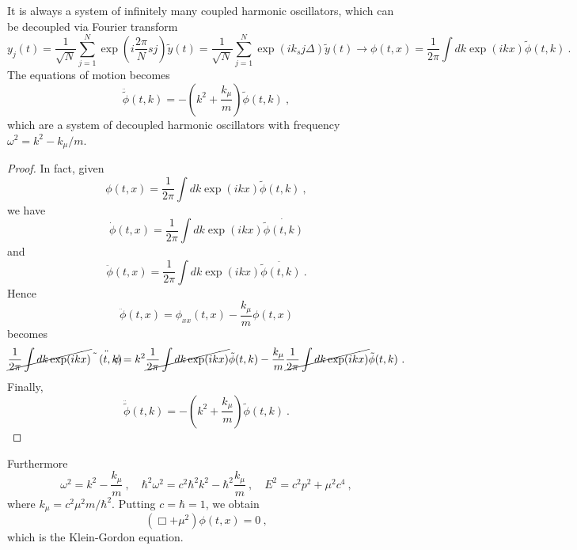     It is always a system of infinitely many coupled harmonic oscillators, which can be decoupled via Fourier transform 
    \begin{equation*}
        y_j(t) = \frac{1}{\sqrt{N}} \sum_{j=1}^N \exp(i \frac{2 \pi}{N} s j) \tilde y(t) = \frac{1}{\sqrt{N}} \sum_{j=1}^N \exp(i k_s j \Delta) \tilde y(t) \rightarrow \phi(t, x) = \frac{1}{2\pi} \int dk \exp(i k x) \tilde \phi(t, k) ~.
    \end{equation*}
    The equations of motion becomes 
    \begin{equation*}
        \ddot{\tilde \phi} (t, k) = - (k^2 + \frac{k_\mu}{m}) \tilde \phi(t, k) ~,
    \end{equation*}
    which are a system of decoupled harmonic oscillators with frequency $\omega^2 = k^2 - k_\mu / m$. 
    \begin{proof}
        In fact, given 
        \begin{equation*}
            \phi(t, x) = \frac{1}{2\pi} \int dk \exp(i k x) \tilde \phi(t, k)  ~,
        \end{equation*}
        we have 
        \begin{equation*}
            \dot \phi(t, x) = \frac{1}{2\pi} \int dk \exp(i k x) \dot{\tilde \phi(t, k)} 
        \end{equation*}
        and 
        \begin{equation*}
            \ddot \phi(t, x) = \frac{1}{2\pi} \int dk \exp(i k x) \ddot{\tilde \phi(t, k)} ~. 
        \end{equation*}
        Hence 
        \begin{equation*}
            \ddot \phi(t, x) = \phi_{xx} (t, x) - \frac{k_\mu}{m} \phi(t, x) 
        \end{equation*}
        becomes 
        \begin{equation*}
            \cancel{\frac{1}{2\pi} \int dk \exp(i k x)} \ddot{\tilde \phi(t, k)} = k^2 \cancel{ \frac{1}{2\pi} \int dk \exp(i k x)} \tilde \phi(t, k) - \frac{k_\mu}{m} \cancel{\frac{1}{2\pi} \int dk \exp(i k x)} \tilde \phi(t, k) ~.
        \end{equation*}
        Finally, 
        \begin{equation*}
            \ddot{\tilde \phi} (t, k) = - (k^2 + \frac{k_\mu}{m}) \tilde \phi(t, k) ~.
        \end{equation*}
    \end{proof}

    Furthermore 
    \begin{equation*}
        \omega^2 = k^2 - \frac{k_\mu}{m} ~, \quad \hbar^2 \omega^2 = c^2 \hbar^2 k^2 - \hbar^2 \frac{k_\mu}{m} ~, \quad E^2 = c^2 p^2 + \mu^2 c^4 ~,
    \end{equation*}
    where $k_\mu = c^2 \mu^2 m / \hbar^2$. Putting $c = \hbar = 1$, we obtain 
    \begin{equation*}
        (\Box + \mu^2) \phi(t, x) = 0 ~,
    \end{equation*}
    which is the Klein-Gordon equation.


